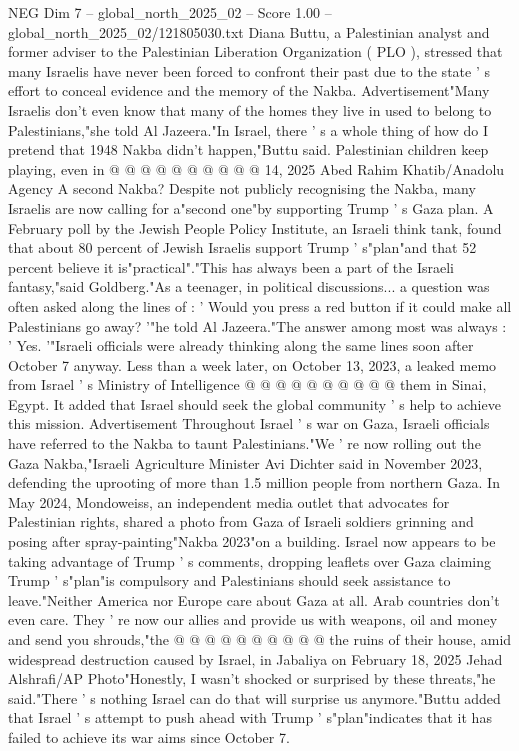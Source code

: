 \begin{textsample}{NEG Dim 7 – global\_north\_2025\_02 – Score 1.00 – global\_north\_2025\_02/121805030.txt}
Diana Buttu, a Palestinian analyst and former adviser to the Palestinian Liberation Organization ( PLO ), stressed that many Israelis have never been forced to confront their past due to the state ' s effort to conceal evidence and the memory of the Nakba.
Advertisement"Many Israelis don't even know that many of the homes they live in used to belong to Palestinians,"she told Al Jazeera."In Israel, there ' s a whole thing of how do I pretend that 1948 Nakba didn't happen,"Buttu said.
Palestinian children keep playing, even in @ @ @ @ @ @ @ @ @ @ 14, 2025 Abed Rahim Khatib/Anadolu Agency A second Nakba?
Despite not publicly recognising the Nakba, many Israelis are now calling for a"second one"by supporting Trump ' s Gaza plan.
A February poll by the Jewish People Policy Institute, an Israeli think tank, found that about 80 percent of Jewish Israelis support Trump ' s"plan"and that 52 percent believe it is"practical"."This has always been a part of the Israeli fantasy,"said Goldberg."As a teenager, in political discussions... a question was often asked along the lines of : ' Would you press a red button if it could make all Palestinians go away? '"he told Al Jazeera."The answer among most was always : ' Yes. '"Israeli officials were already thinking along the same lines soon after October 7 anyway.
Less than a week later, on October 13, 2023, a leaked memo from Israel ' s Ministry of Intelligence @ @ @ @ @ @ @ @ @ @ them in Sinai, Egypt.
It added that Israel should seek the global community ' s help to achieve this mission.
Advertisement Throughout Israel ' s war on Gaza, Israeli officials have referred to the Nakba to taunt Palestinians."We ' re now rolling out the Gaza Nakba,"Israeli Agriculture Minister Avi Dichter said in November 2023, defending the uprooting of more than 1.5 million people from northern Gaza.
In May 2024, Mondoweiss, an independent media outlet that advocates for Palestinian rights, shared a photo from Gaza of Israeli soldiers grinning and posing after spray-painting"Nakba 2023"on a building.
Israel now appears to be taking advantage of Trump ' s comments, dropping leaflets over Gaza claiming Trump ' s"plan"is compulsory and Palestinians should seek assistance to leave."Neither America nor Europe care about Gaza at all.
Arab countries don't even care.
They ' re now our allies and provide us with weapons, oil and money and send you shrouds,"the @ @ @ @ @ @ @ @ @ @ the ruins of their house, amid widespread destruction caused by Israel, in Jabaliya on February 18, 2025 Jehad Alshrafi/AP Photo"Honestly, I wasn't shocked or surprised by these threats,"he said."There ' s nothing Israel can do that will surprise us anymore."Buttu added that Israel ' s attempt to push ahead with Trump ' s"plan"indicates that it has failed to achieve its war aims since October 7.

\end{textsample}
